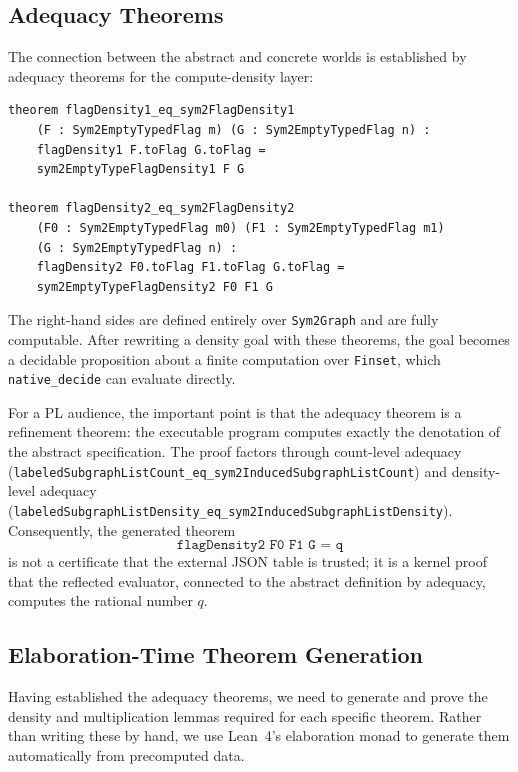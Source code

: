 \documentclass{article}
\newcommand{\lean}[1]{\texttt{#1}}
\begin{document}
\subsection{Adequacy Theorems}

The connection between the abstract and concrete worlds is established by
adequacy theorems for the compute-density layer:
\begin{lstlisting}
theorem flagDensity1_eq_sym2FlagDensity1
    (F : Sym2EmptyTypedFlag m) (G : Sym2EmptyTypedFlag n) :
    flagDensity1 F.toFlag G.toFlag =
    sym2EmptyTypeFlagDensity1 F G

theorem flagDensity2_eq_sym2FlagDensity2
    (F0 : Sym2EmptyTypedFlag m0) (F1 : Sym2EmptyTypedFlag m1)
    (G : Sym2EmptyTypedFlag n) :
    flagDensity2 F0.toFlag F1.toFlag G.toFlag =
    sym2EmptyTypeFlagDensity2 F0 F1 G
\end{lstlisting}
The right-hand sides are defined entirely over \lean{Sym2Graph} and are fully
computable.  After rewriting a density goal with these theorems, the goal
becomes a decidable proposition about a finite computation over
\lean{Finset}, which \lean{native\_decide} can evaluate directly.

For a PL audience, the important point is that the adequacy theorem is a
refinement theorem: the executable program computes exactly the denotation of
the abstract specification.  The proof factors through count-level adequacy
(\lean{labeledSubgraphListCount\_eq\_sym2InducedSubgraphListCount}) and
density-level adequacy
(\lean{labeledSubgraphListDensity\_eq\_sym2InducedSubgraphListDensity}).
Consequently, the generated theorem
\[
  \lean{flagDensity2 F0 F1 G = q}
\]
is not a certificate that the external JSON table is trusted; it is a kernel
proof that the reflected evaluator, connected to the abstract definition by
adequacy, computes the rational number $q$.

\subsection{Elaboration-Time Theorem Generation}

Having established the adequacy theorems, we need to generate and prove the
density and multiplication lemmas required for each specific theorem.  Rather
than writing these by hand, we use Lean~4's elaboration monad to generate
them automatically from precomputed data.
\end{document}
